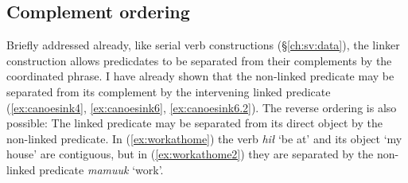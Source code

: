 \begin{comment}
ACTUALLY*2: This works quite well for showing a deictic predicate. Unfortunately it is XL so I cannot use it. Oh well!

ACTUALLY! I think the below is wrong. If you look at XL's sentence, the predicate is deictic ʔaḥʔaa, to which the linker still attaches! This would mean the only counterexample would be Adv V+link. Investigate this further.

But occasionally the linker may occur on the sole predicate in a sentence. This appears to contradict examples (\ref{ex:someonespoke}) and (\ref{ex:*someonespoke}), but the translation provided for these ``dangling" linkers always indicates they are notionally attached to the preceding sentence. I have 1 (look for more, update number) example from my corpus, involving the word \textit{qʷis} `do so'.\footnote{I am not here counting examples from \textit{tupaat} Julia Lucas, who is unique in always uses the the conjunction \textit{ʔunʔuuƛ} with a linker attached. I believe she has a different lexical entry for the word, and will explain in section.} I give one example below:

this is from Charlie Lucas, who I do not have permissions to share. Update it with a sharable example.

Context: \textit{łačiƛni wa. ʔuušciłʔap̓aƛukni nunuuk. ʔuušciłʔap̓aƛukni huyaał.} `We've let it go, haven't we? It has become hard for us to sing. It has become hard for us to dance.'

\ex \label{ex:danglinglinker}
\begingl
\glpreamble ʔaḥʔaa qʷisḥnii.//
\gla ʔaḥʔaa qʷis-(q)ḥ=niˑ //
\glb DDYN do.so-\textsc{link}=\textsc{neut.1pl} //
\glft `That's what happened to us.' //
\endgl
\xe

Although the one predicate is 

\end{comment}


\subsection{Complement ordering} \label{ch:link:participants}

Briefly addressed already, like serial verb constructions (\S\ref{ch:sv:data}), the linker construction allows predicdates to be separated from their complements by the coordinated phrase. I have already shown that the non-linked predicate may be separated from its complement by the intervening linked predicate (\ref{ex:canoesink4}, \ref{ex:canoesink6}, \ref{ex:canoesink6.2}). The reverse ordering is also possible: The linked predicate may be separated from its direct object by the non-linked predicate. In (\ref{ex:workathome}) the verb \textit{hił} `be at' and its object `my house' are contiguous, but in (\ref{ex:workathome2}) they are separated by the non-linked predicate \textit{mamuuk} `work'.

